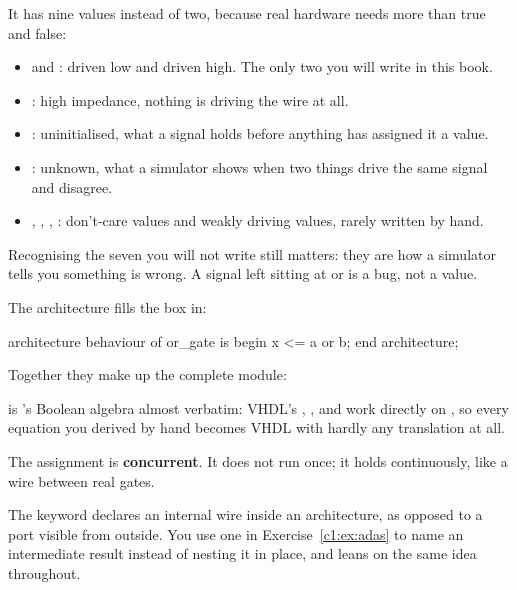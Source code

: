 It has nine values instead of two, because real hardware needs more than true and false:
\begin{itemize}
  \item {} and : driven low and driven high. The only two you will write in this
    book.
  \item {}: high impedance, nothing is driving the wire at all.
  \item {}: uninitialised, what a signal holds before anything has assigned it a value.
  \item {}: unknown, what a simulator shows when two things drive the same signal and
    disagree.
  \item {}, , , : don't-care values and weakly driving
    values, rarely written by hand.
\end{itemize}

Recognising the seven you will not write still matters: they are how a simulator tells you
something is wrong. A signal left sitting at  or  is a bug, not a value.

The architecture fills the box in:

\begin{vhdlcode}
architecture behaviour of or_gate is
begin
    x <= a or b;
end architecture;
\end{vhdlcode}


Together they make up the complete module:


 is 's Boolean algebra almost verbatim: VHDL's
, ,  and  work directly on , so every
equation you derived by hand becomes VHDL with hardly any translation at all.

The assignment is \textbf{concurrent}. It does not run once; it holds continuously, like a wire
between real gates.

The keyword  declares an internal wire inside an architecture, as opposed to a port
visible from outside. You use one in Exercise~\ref{c1:ex:adas} to name an intermediate result
instead of nesting it in place, and  leans on the same idea throughout.

